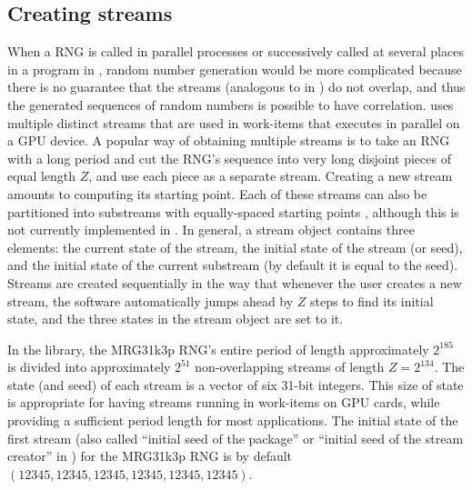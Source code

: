 \documentclass[article,nojss]{jss}\usepackage[]{graphicx}\usepackage[]{color}
\begin{document}
\subsection{Creating streams}\label{createstreams}
When a RNG is called in parallel processes or successively called at several places in a program in , random number generation would be more complicated because there is no guarantee that the streams (analogous to  in ) do not overlap, and thus the generated sequences of random numbers is possible to have correlation.  uses multiple distinct streams that are used in work-items that executes in parallel on a GPU device. A popular way of obtaining multiple streams is to take an RNG with a long period and cut the RNG's sequence into very long disjoint pieces of equal length $Z$, and use each piece as a separate stream. Creating a new stream amounts to computing its starting point. Each of these streams can also be partitioned into substreams with equally-spaced starting points \citep{l2002object, rLEC15a}, although this is not currently implemented in . In general, a stream object contains three elements: the current state of the stream, the initial state of the stream (or seed), and the initial state of the current substream (by default it is equal to the seed). Streams are created sequentially in the way that whenever the user creates a new stream, the software automatically jumps ahead by $Z$ steps to find its initial state, and the three states in the stream object are set to it. 


In the  library, the MRG31k3p RNG's entire period of length approximately $2^{185}$ is divided into approximately $2^{51}$ non-overlapping streams of length $Z = 2^{134}$. %
The state (and seed) of each stream is a vector of six 31-bit integers. This size of state is appropriate for having streams running in work-items on GPU cards, while providing a sufficient period length for most applications. The initial state of the first stream (also called ``initial seed of the package'' or ``initial seed of the stream creator'' in ) for the MRG31k3p RNG is by default $(12345, 12345, 12345, 12345, 12345, 12345)$. 
\end{document}
